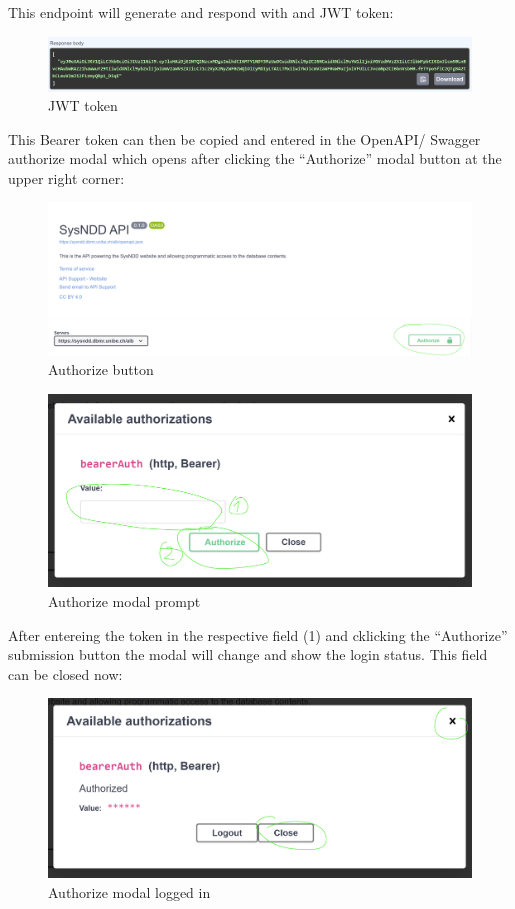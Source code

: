 \documentclass[
]{article}
\begin{document}
This endpoint will generate and respond with and JWT token:

\begin{figure}
\centering
\includegraphics{./static/img/03_02-JWT-token.png}
\caption{JWT token}
\end{figure}

This Bearer token can then be copied and entered in the OpenAPI/ Swagger authorize modal which opens after clicking the ``Authorize'' modal button at the upper right corner:

\begin{figure}
\centering
\includegraphics{./static/img/03_03-api-authorize-a.png}
\caption{Authorize button}
\end{figure}

\begin{figure}
\centering
\includegraphics{./static/img/03_04-api-authorize-b.png}
\caption{Authorize modal prompt}
\end{figure}

After entereing the token in the respective field (1) and cklicking the ``Authorize'' submission button the modal will change and show the login status. This field can be closed now:

\begin{figure}
\centering
\includegraphics{./static/img/03_05-api-authorize-c.png}
\caption{Authorize modal logged in}
\end{figure}
\end{document}
